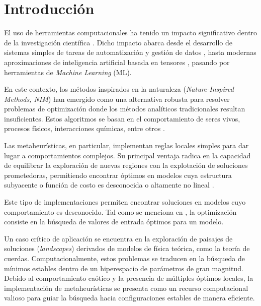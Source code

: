 
\section{Introducción}

El uso de herramientas computacionales ha tenido un impacto
significativo dentro de la investigación científica \cite{Du_2004}.
Dicho impacto abarca desde el desarrollo de sistemas simples de
tareas de automatización y gestión de datos \cite{WOS:A1985ACW9900019},
hasta modernas aproximaciones de inteligencia artificial basada
en tensores \cite{Yenduri_2024, Wilson_2014}, pasando por
herramientas de \textit{Machine Learning} (ML).

En este contexto, los métodos inspirados en la naturaleza
(\foreignlanguage{english}{\textit{Nature-Inspired Methods, NIM}}) han emergido como una
alternativa robusta para resolver problemas de optimización
donde los métodos analíticos tradicionales resultan
insuficientes. Estos algoritmos se basan en el comportamiento
de seres vivos, procesos físicos, interacciones químicas,
entre otros \cite{YANG20203, WOS:000975679700001}.

Las metaheurísticas, en particular, implementan reglas locales
simples para dar lugar a comportamientos complejos. Su
principal ventaja radica en la capacidad de equilibrar la
exploración de nuevas regiones con la explotación de soluciones
prometedoras, permitiendo encontrar óptimos en modelos cuya
estructura subyacente o función de costo es desconocida o
altamente no lineal \cite{YANG20203, Yang2017}.

Este tipo de implementaciones permiten encontrar soluciones en
modelos cuyo comportamiento es desconocido. Tal como se
menciona en \cite{Eiben_2015}, la optimización consiste en la
búsqueda de valores de entrada óptimos para un modelo.

Un caso crítico de aplicación se encuentra en la exploración de
paisajes de soluciones (\foreignlanguage{english}{\textit{landscapes}}) derivados de modelos de
física teórica, como la teoría de cuerdas. Computacionalmente,
estos problemas se traducen en la búsqueda de mínimos estables
dentro de un hiperespacio de parámetros de gran magnitud.
Debido al comportamiento caótico y la presencia de múltiples
óptimos locales, la implementación de metaheurísticas se
presenta como un recurso computacional valioso para guiar la
búsqueda hacia configuraciones estables de manera eficiente.

